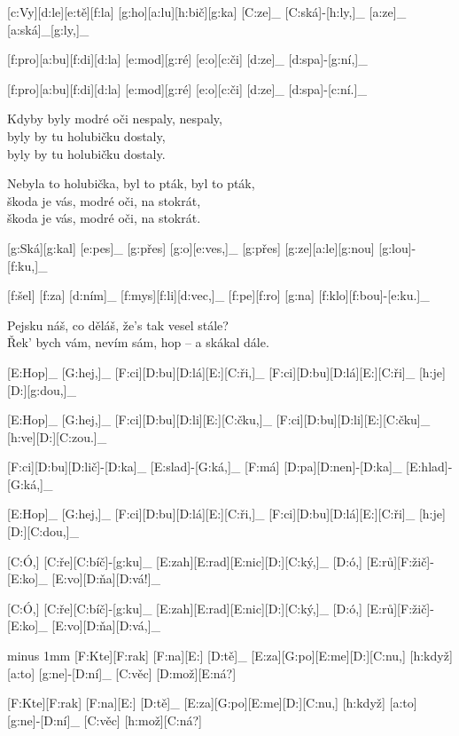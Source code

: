 [c:Vy][d:le][e:tě][f:la] [g:ho][a:lu][h:bič][g:ka] %
[C:ze]_ [C:ská]-[h:ly,]_ [a:ze]_ [a:ská]_[g:ly,]_

[f:pro][a:bu][f:di][d:la] [e:mod][g:ré] [e:o][c:či] %
[d:ze]_ [d:spa]-[g:ní,]_

[f:pro][a:bu][f:di][d:la] [e:mod][g:ré] [e:o][c:či] %
[d:ze]_ [d:spa]-[c:ní.]_

Kdyby byly modré oči nespaly, nespaly,\\
byly by tu holubičku dostaly,\\
byly by tu holubičku dostaly.

Nebyla to holubička, byl to pták, byl to pták,\\
škoda je vás, modré oči, na stokrát,\\
škoda je vás, modré oči, na stokrát.



[g:Ská][g:kal] [e:pes]_ [g:přes] [g:o][e:ves,]_
[g:přes] [g:ze][a:le][g:nou] [g:lou]-[f:ku,]_

[f:šel] [f:za] [d:ním]_ [f:mys][f:li][d:vec,]_
[f:pe][f:ro] [g:na] [f:klo][f:bou]-[e:ku.]_

Pejsku náš, co děláš,
že's tak vesel stále?\\
Řek' bych vám, nevím sám,
hop -- a skákal dále.



[E:Hop]_ [G:hej,]_ [F:ci][D:bu][D:lá][E:][C:ři,]_
[F:ci][D:bu][D:lá][E:][C:ři]_ [h:je][D:][g:dou,]_

[E:Hop]_ [G:hej,]_ [F:ci][D:bu][D:li][E:][C:čku,]_
[F:ci][D:bu][D:li][E:][C:čku]_ [h:ve][D:][C:zou.]_

[F:ci][D:bu][D:lič]-[D:ka]_ [E:slad]-[G:ká,]_
[F:má] [D:pa][D:nen]-[D:ka]_ [E:hlad]-[G:ká,]_

[E:Hop]_ [G:hej,]_ [F:ci][D:bu][D:lá][E:][C:ři,]_
[F:ci][D:bu][D:lá][E:][C:ři]_ [h:je][D:][C:dou,]_



[C:Ó,] [C:ře][C:bíč]-[g:ku]_ [E:zah][E:rad][E:nic][D:][C:ký,]_
[D:ó,] [E:rů][F:žič]-[E:ko]_ [E:vo][D:ňa][D:vá!]_

[C:Ó,] [C:ře][C:bíč]-[g:ku]_ [E:zah][E:rad][E:nic][D:][C:ký,]_
[D:ó,] [E:rů][F:žič]-[E:ko]_ [E:vo][D:ňa][D:vá,]_

{\minw=4.1mm
\pskip=3mm minus 1mm
[F:Kte][F:rak] [F:na][E:] [D:tě]_ [E:za][G:po][E:me][D:][C:nu,] %
[h:když] [a:to] [g:ne]-[D:ní]_ [C:věc] [D:mož][E:ná?] %

[F:Kte][F:rak] [F:na][E:] [D:tě]_ [E:za][G:po][E:me][D:][C:nu,] %
[h:když] [a:to] [g:ne]-[D:ní]_ [C:věc] [h:mož][C:ná?] %
}

